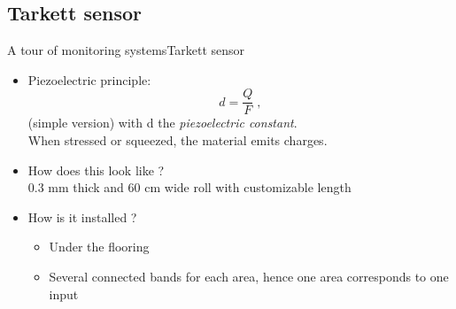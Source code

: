 \documentclass[8pt,t,aspectratio=1610]{beamer}
\begin{document}
\subsection{Tarkett sensor}
\begin{frame}{A tour of monitoring systems}{Tarkett sensor}
\begin{minipage}[t]{0.35\linewidth}
    \vspace{0pt}
    \begin{itemize}
        \item Piezoelectric principle: $$d = \frac{Q}{F}\;,$$ (simple version) with d the \emph{piezoelectric constant}.\\
        When stressed or squeezed, the material emits charges.\\
        \pause
        \item How does this look like ?\\
            0.3 mm thick and 60 cm wide roll with customizable length
        \pause
        \item How is it installed ?\\
            \begin{itemize}
                \item Under the flooring
                \item Several connected bands for each area, hence one area corresponds to one input
            \end{itemize}


\end{itemize}
\end{minipage}
\end{frame}
\end{document}
